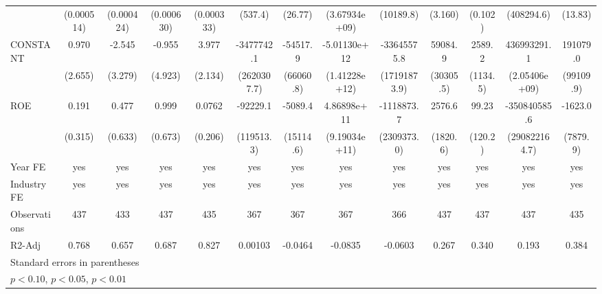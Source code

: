 \begin{table}[htbp]
\begin{tabular}{l*{12}{c}}
                    &  (0.000514)         &  (0.000424)         &  (0.000630)         &  (0.000333)         &     (537.4)         &     (26.77)         &(3.67934e+09)         &   (10189.8)         &     (3.160)         &     (0.102)         &  (408294.6)         &     (13.83)         \\
CONSTANT            &       0.970         &      -2.545         &      -0.955         &       3.977\sym{*}  &  -3477742.1         &    -54517.9         &-5.01130e+12\sym{***}& -33645575.8\sym{*}  &     59084.9\sym{*}  &      2589.2\sym{**} & 436993291.1         &    191079.0\sym{*}  \\
                    &     (2.655)         &     (3.279)         &     (4.923)         &     (2.134)         & (2620307.7)         &   (66060.8)         &(1.41228e+12)         &(17191873.9)         &   (30305.5)         &    (1134.5)         &(2.05406e+09)         &   (99109.9)         \\
ROE                 &       0.191         &       0.477         &       0.999         &      0.0762         &    -92229.1         &     -5089.4         & 4.86898e+11         &  -1118873.7         &      2576.6         &       99.23         &-350840585.6         &     -1623.0         \\
                    &     (0.315)         &     (0.633)         &     (0.673)         &     (0.206)         &  (119513.3)         &   (15114.6)         &(9.19034e+11)         & (2309373.0)         &    (1820.6)         &     (120.2)         &(290822164.7)         &    (7879.9)         \\
\hline
Year FE             &         yes         &         yes         &         yes         &         yes         &         yes         &         yes         &         yes         &         yes         &         yes         &         yes         &         yes         &         yes         \\
Industry FE         &         yes         &         yes         &         yes         &         yes         &         yes         &         yes         &         yes         &         yes         &         yes         &         yes         &         yes         &         yes         \\
Observations        &         437         &         433         &         437         &         435         &         367         &         367         &         367         &         366         &         437         &         437         &         437         &         435         \\
R2-Adj              &       0.768         &       0.657         &       0.687         &       0.827         &     0.00103         &     -0.0464         &     -0.0835         &     -0.0603         &       0.267         &       0.340         &       0.193         &       0.384         \\
\hline\hline
\multicolumn{13}{l}{\footnotesize Standard errors in parentheses}\\
\multicolumn{13}{l}{\footnotesize \sym{*} \(p<0.10\), \sym{**} \(p<0.05\), \sym{***} \(p<0.01\)}\\
\end{tabular}
\end{table}
